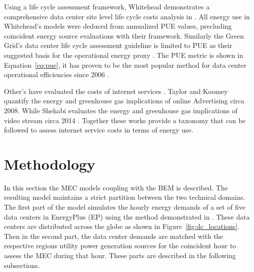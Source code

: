 Using a life cycle assessment framework, Whitehead demonstrates a comprehensive data center site level life cycle costs analysis in \citep{whitehead15}. All energy use in Whitehead’s models were deduced from annualized PUE values, precluding coincident energy source evaluations with their framework. Similarly the Green Grid’s data center life cycle assessment guideline is limited to PUE as their suggested basis for the operational energy proxy \citep{tgg12}. The PUE metric is shown in Equation~\ref{eq:pue}, it has proven to be the most popular method for data center operational efficiencies since 2006 \citep{wiki_pue}.



Other’s have evaluated the costs of internet services \citep{koomey08,shehabi14}. Taylor and Koomey quantify the energy and greenhouse gas implications of online Advertising circa 2008. While Shehabi evaluates the energy and greenhouse gas implications of video stream circa 2014 \citep{shehabi14}. Together these works provide a taxonomy that can be followed to assess internet service costs in terms of energy use. 

\section{Methodology}
In this section the MEC model\textsc{}s coupling with the BEM is described. The resulting model maintains a strict partition between the two technical domains. The first part of the model simulates the hourly energy demands of a set of five data centers in EnergyPlus (EP) using the method demonstrated in \citep{kumar20}. These data centers are distributed across the globe as shown in Figure~\ref{fig:dc_locations}. Then in the second part, the data center demands are matched with the respective region\textsc{}s utility power generation sources for the coincident hour to assess the MEC during that hour. These parts are described in the following subsections. 

